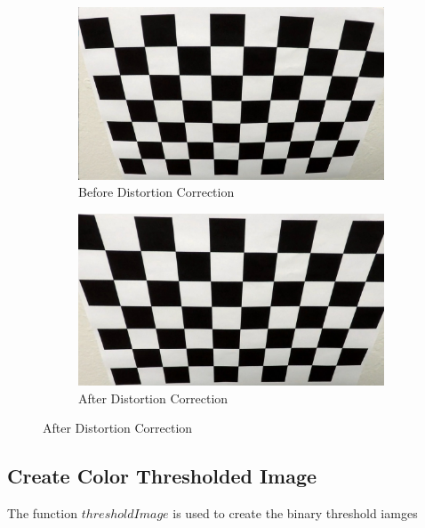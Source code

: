 \documentclass{article}
\begin{document}
\begin{figure}
     \centering
     \begin{subfigure}[b]{0.4\textwidth}
         \centering
         \includegraphics[width=\textwidth]{../camera_cal/calibration2.jpg}
         \caption{Before Distortion Correction}
         \label{fig:1a}
     \end{subfigure}
     \hfill
     \begin{subfigure}[b]{0.4\textwidth}
         \centering
         \includegraphics[width=\textwidth]{../output_images/undistort/alibration2.jpg}
         \caption{After Distortion Correction}
         \label{fig:1b}
     \end{subfigure}
\end{figure}
\subsection{Create Color Thresholded Image} 
The function $thresholdImage$ is used to create the binary threshold iamges
\end{document}

